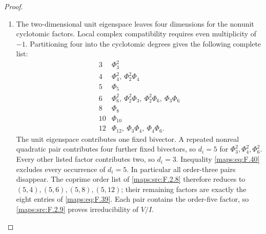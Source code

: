 \begin{proof}
\begin{enumerate}[label=\arabic*.]
\item The two-dimensional unit eigenspace leaves four dimensions
for the nonunit cyclotomic factors.  Local complex compatibility
requires even multiplicity of $-1$.  Partitioning four into the
cyclotomic degrees gives the following complete list:
\[
\begin{array}{c|l}
3&\Phi_3^2\\
4&\Phi_4^2,\ \Phi_2^2\Phi_4\\
5&\Phi_5\\
6&\Phi_6^2,\ \Phi_2^2\Phi_3,\ \Phi_2^2\Phi_6,\ \Phi_3\Phi_6\\
8&\Phi_8\\
10&\Phi_{10}\\
12&\Phi_{12},\ \Phi_3\Phi_4,\ \Phi_4\Phi_6.
\end{array}
\]
The unit eigenspace contributes one fixed bivector.  A repeated
nonreal quadratic pair contributes four further fixed bivectors,
so $d_i=5$ for $\Phi_3^2,\Phi_4^2,\Phi_6^2$.
Every other listed factor contributes two, so $d_i=3$.
Inequality \eqref{maps:eq:F.40} excludes every occurrence of
$d_i=5$.  In particular all order-three pairs disappear.
The coprime order list of \cref{maps:src:F.2.8} therefore reduces
to $(5,4),(5,6),(5,8),(5,12)$; their remaining factors are exactly
the eight entries of \eqref{maps:eq:F.39}.
Each pair contains the order-five factor, so
\cref{maps:src:F.2.9} proves irreducibility of $V/I$.
\end{enumerate}
\end{proof}




